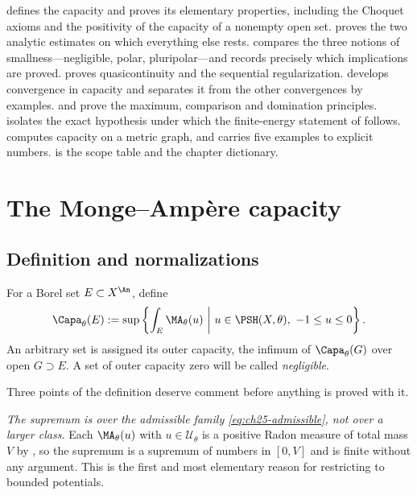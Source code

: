  defines the capacity and proves its elementary
properties, including the Choquet axioms and the positivity of the capacity
of a nonempty open set.   proves the two analytic
estimates on which everything else rests.  
compares the three notions of smallness---negligible, polar, pluripolar---and
records precisely which implications are proved.
 proves quasicontinuity and the sequential
regularization.   develops convergence in capacity
and separates it from the other convergences by examples.
 and  prove the maximum,
comparison and domination principles.   isolates the exact
hypothesis under which the finite-energy statement of
 follows.   computes capacity on
a metric graph, and  carries five examples to explicit
numbers.   is the scope table and
 the chapter dictionary.

\section{The Monge--Amp\`ere capacity}
\label{sec:ch25-capacity}

\subsection{Definition and normalizations}
\label{sec:ch25-definition}

\begin{definition}[Capacity]
\label{def:bfj-capacity}
For a Borel set \(E\subset X^{\An}\), define
\begin{equation}
\label{eq:capacity-definition}
 \Capa_\theta(E)
 :=\sup\left\{\int_E\MA_\theta(u)\ \middle|\
       u\in\PSH(X,\theta),\ -1\leq u\leq0\right\}.
\end{equation}
An arbitrary set is assigned its outer capacity, the infimum of
\(\Capa_\theta(G)\) over open \(G\supset E\). A set of outer capacity zero
will be called \emph{negligible}.
\end{definition}

Three points of the definition deserve comment before anything is proved
with it.

\emph{The supremum is over the admissible family
\eqref{eq:ch25-admissible}, not over a larger class.}  Each
\(\MA_\theta(u)\) with \(u\in\mathcal U_\theta\) is a positive Radon measure
of total mass \(V\) by \Cref{thm:bounded-ma-extension}, so the supremum is a
supremum of numbers in \([0,V]\) and is finite without any argument.  This is
the first and most elementary reason for restricting to bounded potentials.

